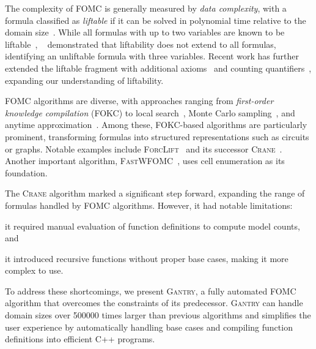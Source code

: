 \documentclass[letterpaper]{article} %
\theoremstyle{remark}
\theoremstyle{definition}
\newcommand{\Cranetwo}{\textsc{Gantry}}
\begin{document}

The complexity of FOMC is generally measured by \emph{data complexity}, with a
formula classified as \emph{liftable} if it can be solved in polynomial time
relative to the domain size~\cite{DBLP:conf/starai/JaegerB12}. While all
formulas with up to two variables are known to be
liftable~\cite{DBLP:conf/nips/Broeck11,DBLP:conf/kr/BroeckMD14},
\citeauthor{DBLP:conf/pods/BeameBGS15}~
demonstrated that liftability does not extend to all formulas, identifying an
unliftable formula with three variables. Recent work has further extended the
liftable fragment with additional
axioms~\cite{DBLP:conf/aaai/TothK23,DBLP:journals/ai/BremenK23} and counting
quantifiers~\cite{DBLP:journals/jair/Kuzelka21}, expanding our understanding of
liftability.


FOMC algorithms are diverse, with approaches ranging from \emph{first-order
  knowledge compilation} (FOKC) to local
search~\cite{DBLP:journals/pvldb/NiuRDS11}, Monte Carlo
sampling~\cite{DBLP:journals/cacm/GogateD16}, and anytime
approximation~\cite{DBLP:conf/ijcai/BremenK20}. Among these, FOKC-based
algorithms are particularly prominent, transforming formulas into structured
representations such as circuits or graphs. Notable examples include
\textsc{ForcLift}~\cite{DBLP:conf/ijcai/BroeckTMDR11} and its successor
\textsc{Crane}~\cite{DBLP:conf/kr/DilkasB23}. Another important algorithm,
\textsc{FastWFOMC}~\cite{DBLP:conf/uai/BremenK21}, uses cell enumeration as its
foundation.


The \textsc{Crane} algorithm marked a significant step forward, expanding the
range of formulas handled by FOMC algorithms. However, it had notable
limitations:
\begin{enumerate*}[label=(\roman*)]
  \item it required manual evaluation of function definitions to compute model
  counts, and
  \item it introduced recursive functions without proper base cases, making it
  more complex to use.
\end{enumerate*}
To address these shortcomings, we present \Cranetwo{}, a fully automated FOMC
algorithm that overcomes the constraints of its predecessor. \Cranetwo{} can
handle domain sizes over \num{500000} times larger than previous algorithms and
simplifies the user experience by automatically handling base cases and
compiling function definitions into efficient C++ programs.
\end{document}
